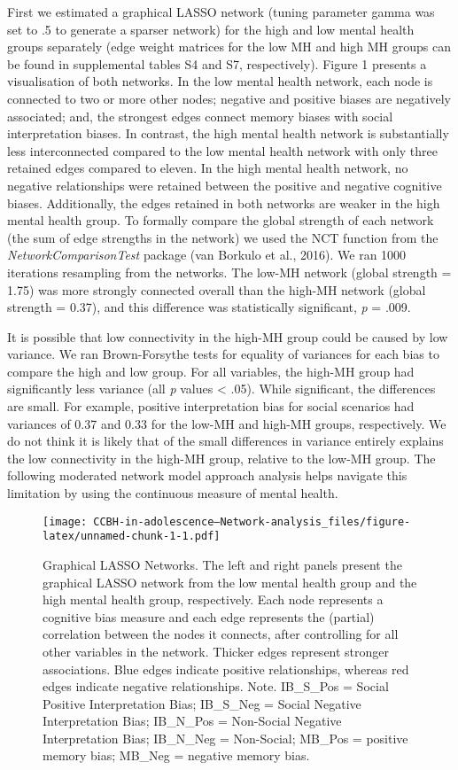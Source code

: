 \documentclass[
  english,
  man,floatsintext]{apa6}
\begin{document}
First we estimated a graphical LASSO network (tuning parameter gamma was set to .5 to generate a sparser network) for the high and low mental health groups separately (edge weight matrices for the low MH and high MH groups can be found in supplemental tables S4 and S7, respectively). Figure 1 presents a visualisation of both networks. In the low mental health network, each node is connected to two or more other nodes; negative and positive biases are negatively associated; and, the strongest edges connect memory biases with social interpretation biases. In contrast, the high mental health network is substantially less interconnected compared to the low mental health network with only three retained edges compared to eleven. In the high mental health network, no negative relationships were retained between the positive and negative cognitive biases. Additionally, the edges retained in both networks are weaker in the high mental health group. To formally compare the global strength of each network (the sum of edge strengths in the network) we used the NCT function from the \emph{NetworkComparisonTest} package (van Borkulo et al., 2016). We ran 1000 iterations resampling from the networks. The low-MH network (global strength = 1.75) was more strongly connected overall than the high-MH network (global strength = 0.37), and this difference was statistically significant, \emph{p} = .009.

It is possible that low connectivity in the high-MH group could be caused by low variance. We ran Brown-Forsythe tests for equality of variances for each bias to compare the high and low group. For all variables, the high-MH group had significantly less variance (all \emph{p} values \textless{} .05). While significant, the differences are small. For example, positive interpretation bias for social scenarios had variances of 0.37 and 0.33 for the low-MH and high-MH groups, respectively. We do not think it is likely that of the small differences in variance entirely explains the low connectivity in the high-MH group, relative to the low-MH group. The following moderated network model approach analysis helps navigate this limitation by using the continuous measure of mental health.

\begin{figure}
\centering
\texttt{[image: CCBH-in-adolescence---Network-analysis\_files/figure-latex/unnamed-chunk-1-1.pdf]}
\caption{\label{fig:unnamed-chunk-1}Graphical LASSO Networks. The left and right panels present the graphical LASSO network from the low mental health group and the high mental health group, respectively. Each node represents a cognitive bias measure and each edge represents the (partial) correlation between the nodes it connects, after controlling for all other variables in the network. Thicker edges represent stronger associations. Blue edges indicate positive relationships, whereas red edges indicate negative relationships.
Note. IB\_S\_Pos = Social Positive Interpretation Bias; IB\_S\_Neg = Social Negative Interpretation Bias; IB\_N\_Pos = Non-Social Negative Interpretation Bias; IB\_N\_Neg = Non-Social; MB\_Pos = positive memory bias; MB\_Neg = negative memory bias.}
\end{figure}
\end{document}
